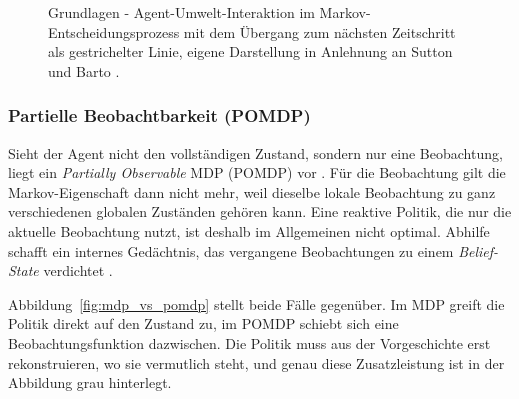 \documentclass[11pt,a4paper]{article}
\begin{document}
\begin{figure}[h]
\centering
{}
\caption[Agent-Umwelt-Interaktion im MDP]{Grundlagen - Agent-Umwelt-Interaktion
im Markov-Entschei\-dungs\-pro\-zess mit dem Übergang zum nächsten Zeitschritt
als gestrichelter Linie, eigene Darstellung in Anlehnung an Sutton und Barto
\cite[Abb.~3.1]{sutton2018rl}.}
\label{fig:mdp_loop}
\end{figure}

\subsubsection{Partielle Beobachtbarkeit (POMDP)}
\label{sec:pomdp}

Sieht der Agent nicht den vollständigen Zustand, sondern nur eine Beobachtung,
liegt ein \emph{Partially Observable} MDP (POMDP) vor \cite{kaelbling1998pomdp}.
Für die Beobachtung gilt die Markov-Eigenschaft dann nicht mehr, weil dieselbe
lokale Beobachtung zu ganz verschiedenen globalen Zuständen gehören kann. Eine
reaktive Politik, die nur die aktuelle Beobachtung nutzt, ist deshalb im
Allgemeinen nicht optimal. Abhilfe schafft ein internes Gedächtnis, das
vergangene Beobachtungen zu einem \emph{Belief-State} verdichtet
\cite{hausknecht2015drqn}.

Abbildung~\ref{fig:mdp_vs_pomdp} stellt beide Fälle gegenüber. Im MDP greift die
Politik direkt auf den Zustand zu, im POMDP schiebt sich eine
Beobachtungsfunktion dazwischen. Die Politik muss aus der Vorgeschichte erst
rekonstruieren, wo sie vermutlich steht, und genau diese Zusatzleistung ist in
der Abbildung grau hinterlegt.
\end{document}
